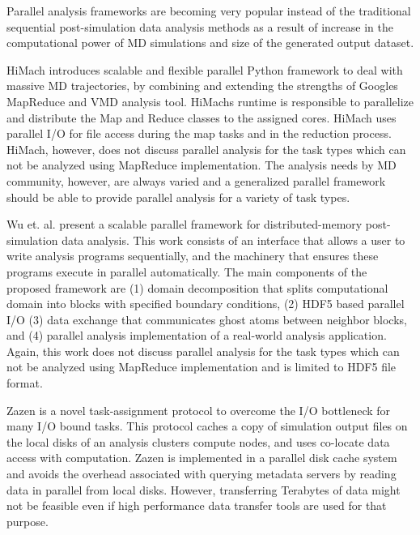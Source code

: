 \label{background}

Parallel analysis frameworks are becoming very popular instead of the traditional sequential post-simulation data analysis methods as a result of increase in the computational power of MD simulations and size of the generated output dataset.

HiMach \cite{himach-2008} introduces scalable and flexible parallel Python framework to deal with massive MD trajectories, by combining and extending the strengths of Google\textsc{}s MapReduce and VMD analysis tool. 
HiMach\textsc{}s runtime is responsible to parallelize and distribute the Map and Reduce classes to the assigned cores.
HiMach uses parallel I/O for file access during the map tasks and  in the reduction process. 
HiMach, however, does not discuss parallel analysis for the task types which can not be analyzed using MapReduce implementation.
The analysis needs by MD community, however, are always varied and a generalized parallel framework should be able to provide parallel analysis for a variety of task types.

Wu et. al. \cite{Wu_et.al} present a scalable parallel framework for distributed-memory post-simulation data analysis.
This work consists of an interface that allows a user to write analysis programs sequentially, and the machinery that ensures these programs execute in parallel automatically. 
The main components of the proposed framework are (1) domain decomposition that splits computational domain into blocks with specified boundary conditions, (2) HDF5 based parallel I/O (3) data exchange
that communicates ghost atoms between neighbor blocks, and (4) parallel analysis implementation of a real-world analysis application.
Again, this work does not discuss parallel analysis for the task types which can not be analyzed using MapReduce implementation and is limited to HDF5 file format.

Zazen \cite{Zazen} is a novel task-assignment protocol to overcome the I/O bottleneck for many I/O bound tasks.
This protocol caches a copy of simulation output files on the local disks of an analysis cluster\textsc{}s compute nodes, and uses co-locate data access with computation. 
Zazen is implemented in a parallel disk cache system and avoids the overhead associated with querying metadata servers by reading data in parallel from local disks.
However, transferring Terabytes of data might not be feasible even if high performance data transfer tools are used for that purpose.

